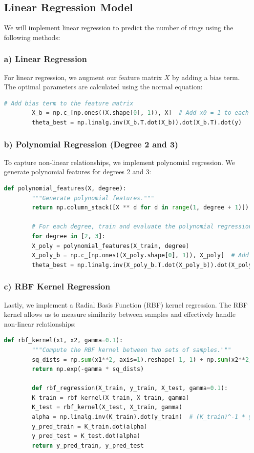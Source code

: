 \documentclass{article}
\begin{document}
	\subsection*{Linear Regression Model}
	We will implement linear regression to predict the number of rings using the following methods:
	
	\subsubsection*{a) Linear Regression}
	For linear regression, we augment our feature matrix \( X \) by adding a bias term. The optimal parameters are calculated using the normal equation:
	\begin{lstlisting}[language=Python]
		# Add bias term to the feature matrix
		X_b = np.c_[np.ones((X.shape[0], 1)), X]  # Add x0 = 1 to each instance
		theta_best = np.linalg.inv(X_b.T.dot(X_b)).dot(X_b.T).dot(y)
	\end{lstlisting}
	
	\subsubsection*{b) Polynomial Regression (Degree 2 and 3)}
	To capture non-linear relationships, we implement polynomial regression. We generate polynomial features for degrees 2 and 3:
	\begin{lstlisting}[language=Python]
		def polynomial_features(X, degree):
		"""Generate polynomial features."""
		return np.column_stack([X ** d for d in range(1, degree + 1)])
		
		# For each degree, train and evaluate the polynomial regression model
		for degree in [2, 3]:
		X_poly = polynomial_features(X_train, degree)
		X_poly_b = np.c_[np.ones((X_poly.shape[0], 1)), X_poly]  # Add bias term
		theta_best = np.linalg.inv(X_poly_b.T.dot(X_poly_b)).dot(X_poly_b.T).dot(y_train)
	\end{lstlisting}
	
	\subsubsection*{c) RBF Kernel Regression}
	Lastly, we implement a Radial Basis Function (RBF) kernel regression. The RBF kernel allows us to measure similarity between samples and effectively handle non-linear relationships:
	\begin{lstlisting}[language=Python]
		def rbf_kernel(x1, x2, gamma=0.1):
		"""Compute the RBF kernel between two sets of samples."""
		sq_dists = np.sum(x1**2, axis=1).reshape(-1, 1) + np.sum(x2**2, axis=1) - 2 * np.dot(x1, x2.T)
		return np.exp(-gamma * sq_dists)
		
		def rbf_regression(X_train, y_train, X_test, gamma=0.1):
		K_train = rbf_kernel(X_train, X_train, gamma)
		K_test = rbf_kernel(X_test, X_train, gamma)
		alpha = np.linalg.inv(K_train).dot(y_train)  # (K_train)^-1 * y_train
		y_pred_train = K_train.dot(alpha)
		y_pred_test = K_test.dot(alpha)
		return y_pred_train, y_pred_test
	\end{lstlisting}
	
\end{document}
